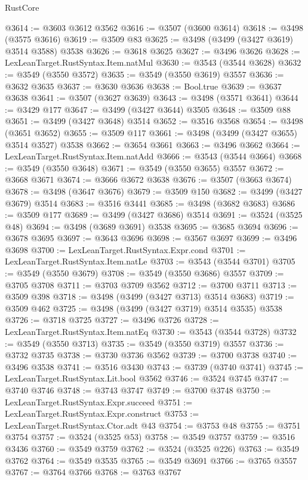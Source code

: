 \begin{lexlean}{RustCore}
\begin{coremodule}
@3614 := @3603 @3612 @3562
@3616 := @3507 (@3600 @3614)
@3618 := @3498 (@3575 @3616)
@3619 := @3509 @83
@3625 := @3498 (@3499 (@3427 @3619) @3514 @3588) @3538
@3626 := @3618 @3625
@3627 := @3496 @3626
@3628 := LexLeanTarget.RustSyntax.Item.natMul
@3630 := @3543 (@3544 @3628)
@3632 := @3549 (@3550 @3572)
@3635 := @3549 (@3550 @3619) @3557
@3636 := @3632 @3635
@3637 := @3630 @3636
@3638 := Bool.true
@3639 := @3637 @3638
@3641 := @3507 (@3627 @3639)
@3643 := @3498 (@3571 @3641)
@3644 := @3429 @177
@3647 := @3499 (@3427 @3644) @3505
@3648 := @3509 @88
@3651 := @3499 (@3427 @3648) @3514
@3652 := @3516 @3568
@3654 := @3498 (@3651 @3652)
@3655 := @3509 @117
@3661 := @3498 (@3499 (@3427 @3655) @3514 @3527) @3538
@3662 := @3654 @3661
@3663 := @3496 @3662
@3664 := LexLeanTarget.RustSyntax.Item.natAdd
@3666 := @3543 (@3544 @3664)
@3668 := @3549 (@3550 @3648)
@3671 := @3549 (@3550 @3655) @3557
@3672 := @3668 @3671
@3674 := @3666 @3672 @3638
@3676 := @3507 (@3663 @3674)
@3678 := @3498 (@3647 @3676)
@3679 := @3509 @150
@3682 := @3499 (@3427 @3679) @3514
@3683 := @3516 @3441
@3685 := @3498 (@3682 @3683)
@3686 := @3509 @177
@3689 := @3499 (@3427 @3686) @3514
@3691 := @3524 (@3525 @48)
@3694 := @3498 (@3689 @3691) @3538
@3695 := @3685 @3694
@3696 := @3678 @3695
@3697 := @3643 @3696
@3698 := @3567 @3697
@3699 := @3496 @3698
@3700 := LexLeanTarget.RustSyntax.Expr.cond
@3701 := LexLeanTarget.RustSyntax.Item.natLe
@3703 := @3543 (@3544 @3701)
@3705 := @3549 (@3550 @3679)
@3708 := @3549 (@3550 @3686) @3557
@3709 := @3705 @3708
@3711 := @3703 @3709 @3562
@3712 := @3700 @3711
@3713 := @3509 @398
@3718 := @3498 (@3499 (@3427 @3713) @3514 @3683)
@3719 := @3509 @462
@3725 := @3498 (@3499 (@3427 @3719) @3514 @3535) @3538
@3726 := @3718 @3725
@3727 := @3496 @3726
@3728 := LexLeanTarget.RustSyntax.Item.natEq
@3730 := @3543 (@3544 @3728)
@3732 := @3549 (@3550 @3713)
@3735 := @3549 (@3550 @3719) @3557
@3736 := @3732 @3735
@3738 := @3730 @3736 @3562
@3739 := @3700 @3738
@3740 := @3496 @3538
@3741 := @3516 @3430
@3743 := @3739 (@3740 @3741)
@3745 := LexLeanTarget.RustSyntax.Lit.bool @3562
@3746 := @3524 @3745
@3747 := @3740 @3746
@3748 := @3743 @3747
@3749 := @3700 @3748
@3750 := LexLeanTarget.RustSyntax.Expr.succeed
@3751 := LexLeanTarget.RustSyntax.Expr.construct
@3753 := LexLeanTarget.RustSyntax.Ctor.adt @43
@3754 := @3753 @48
@3755 := @3751 @3754
@3757 := @3524 (@3525 @53)
@3758 := @3549 @3757
@3759 := @3516 @3436
@3760 := @3549 @3759
@3762 := @3524 (@3525 @226)
@3763 := @3549 @3762
@3764 := @3549 @3535
@3765 := @3549 @3691
@3766 := @3765 @3557
@3767 := @3764 @3766
@3768 := @3763 @3767

\end{coremodule}
\end{lexlean}
